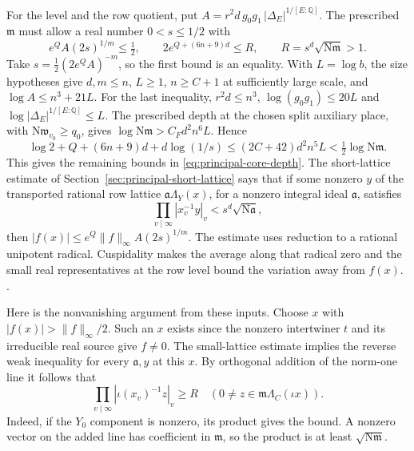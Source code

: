 For the level and the row quotient, put
\(A=r^2 d\, g_0g_1\,|\Delta_E|^{1/[E:\mathbb Q]}\).
The prescribed \(\mathfrak m\) must allow a real number \(0<s\le1/2\)
with
\begin{equation}
 \label{eq:principal-core-depth}
 e^Q A(2s)^{1/m}\le\tfrac12,\qquad
 2e^{Q+(6n+9)d}\le R,\qquad
 R=s^d\sqrt{\mathrm N\mathfrak m}>1 .
\end{equation}
Take \(s=\tfrac12(2e^Q A)^{-m}\), so the first bound is
an equality. With \(L=\log b\), the size hypotheses give
\(d,m\le n\), \(L\ge1\), \(n\ge C+1\) at sufficiently large
scale, and \(\log A\le n^3+21L\). For the last inequality,
\(r^2d\le n^3\), \(\log(g_0g_1)\le20L\) and
\(\log|\Delta_E|^{1/[E:\mathbb Q]}\le L\). The prescribed
depth at the chosen split auxiliary place, with
\(\mathrm N\mathfrak w_{v_0}\ge q_0\), gives
\(\log\mathrm N\mathfrak m>C_F d^2 n^6 L\). Hence
\[
 \log 2+Q+(6n+9)d+d\log(1/s)
 \le(2C+42)d^2n^5L
 <\tfrac12\log\mathrm N\mathfrak m .
\]
This gives the remaining bounds in \eqref{eq:principal-core-depth}.
The short-lattice estimate of Section~\ref{sec:principal-short-lattice} says that if
some nonzero \(y\) of the transported rational row lattice
\(\mathfrak a\Lambda_Y(x)\), for a nonzero integral ideal
\(\mathfrak a\), satisfies
\[
 \prod_{v\mid\infty}|x_v^{-1}y|_v
       <s^d\sqrt{\mathrm N\mathfrak a},
\]
then \(|f(x)|\le e^Q\|f\|_\infty A(2s)^{1/m}\). The
estimate uses reduction to a rational unipotent radical.
Cuspidality makes the average along that radical zero and
the small real representatives at the row level bound the
variation away from \(f(x)\).
.

Here is the nonvanishing argument from these inputs. Choose \(x\)
with \(|f(x)|>\|f\|_\infty/2\). Such an \(x\) exists since
the nonzero intertwiner \(t\) and its irreducible real source give
\(f\ne0\). The small-lattice estimate implies the reverse
weak inequality for every \(\mathfrak a,y\) at this \(x\).
By orthogonal addition of the norm-one line it follows that
\[
 \prod_{v\mid\infty}|\iota(x_v)^{-1}z|_v\ge R
 \quad
 (0\ne z\in \mathfrak m\Lambda_C(\iota x)).
\]
Indeed, if the \(Y_0\) component is nonzero, its product gives
the bound. A nonzero vector on the added line has coefficient in
\(\mathfrak m\), so the product is at least
\(\sqrt{\mathrm N\mathfrak m}\).

